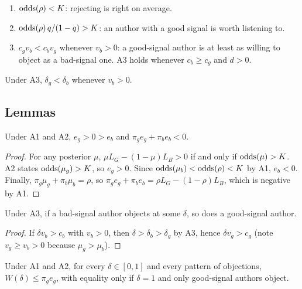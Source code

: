 \begin{assumption}\label{ass:all}
\leavevmode
\begin{enumerate}
  \item[(A1)] $\operatorname{odds}(\rho) < K$: rejecting is right on average.
  \item[(A2)] $\operatorname{odds}(\rho)\, q/(1-q) > K$: an author with a good signal is worth listening to.
  \item[(A3)] $c_g v_b < c_b v_g$ whenever $v_b > 0$: a good-signal author is at least as
  willing to object as a bad-signal one. A3 holds whenever $c_b \ge c_g$ and $d > 0$.
\end{enumerate}
\end{assumption}

Under A3, $\delta_g < \delta_b$ whenever $v_b > 0$.

\subsection{Lemmas}

\begin{lemma}[Signs]\label{lem:signs}
Under A1 and A2, $e_g > 0 > e_b$ and $\pi_g e_g + \pi_b e_b < 0$.
\end{lemma}

\begin{proof}
For any posterior $\mu$, $\mu L_G - (1-\mu) L_B > 0$ if and only if $\operatorname{odds}(\mu) > K$. A2 states
$\operatorname{odds}(\mu_g) > K$, so $e_g > 0$. Since $\operatorname{odds}(\mu_b) < \operatorname{odds}(\rho) < K$ by A1, $e_b < 0$.
Finally, $\pi_g \mu_g + \pi_b \mu_b = \rho$, so $\pi_g e_g + \pi_b e_b = \rho L_G - (1-\rho) L_B$,
which is negative by A1.
\end{proof}

\begin{lemma}\label{lem:monotone}
Under A3, if a bad-signal author objects at some $\delta$, so does a good-signal author.
\end{lemma}

\begin{proof}
If $\delta v_b > c_b$ with $v_b > 0$, then $\delta > \delta_b > \delta_g$ by A3, hence
$\delta v_g > c_g$ (note $v_g \ge v_b > 0$ because $\mu_g > \mu_b$).
\end{proof}

\begin{lemma}\label{lem:firstbest}
Under A1 and A2, for every $\delta \in [0,1]$ and every pattern of objections,
$W(\delta) \le \pi_g e_g$, with equality only if $\delta = 1$ and only good-signal authors object.
\end{lemma}


